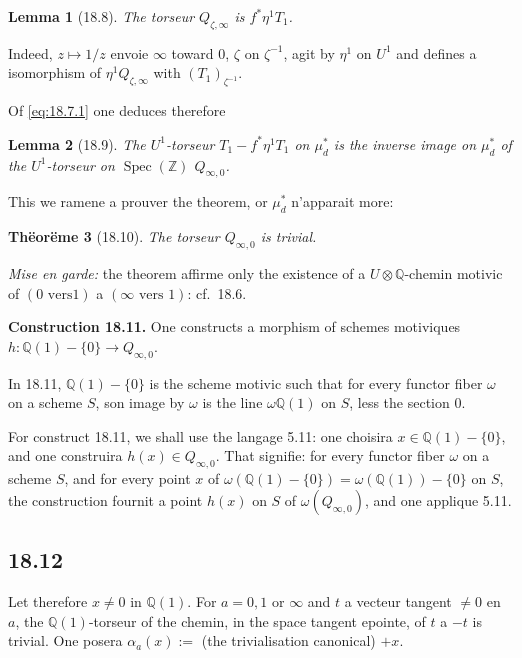 \documentclass[12pt,a4paper]{article}
\theoremstyle{plain}
\newtheorem{theorem}{Th\"eor\"eme}[section]
\newtheorem{lemma}[theorem]{Lemma}
\theoremstyle{definition}
\theoremstyle{remark}
\DeclareMathOperator{\Spec}{Spec}
\newcommand{\ZZ}{\mathbb{Z}}
\newcommand{\QQ}{\mathbb{Q}}
\begin{document}
\begin{lemma}[18.8]\label{lem:18.8}
The torseur $Q_{\zeta,\infty}$ is $f^*\eta^1 T_1$.
\end{lemma}

Indeed, $z \mapsto 1/z$ envoie $\infty$ toward $0$, $\zeta$ on
$\zeta^{-1}$, agit by $\eta^1$ on $U^1$ and defines a isomorphism of
$\eta^1 Q_{\zeta,\infty}$ with $(T_1)_{\zeta^{-1}}$.

Of \eqref{eq:18.7.1} one deduces therefore

\begin{lemma}[18.9]\label{lem:18.9}
The $U^1$-torseur $T_1 - f^*\eta^1 T_1$ on $\mu_d^*$ is the inverse image on $\mu_d^*$ of the $U^1$-torseur on $\Spec(\ZZ)$ $Q_{\infty,0}$.
\end{lemma}

This we ramene a prouver the theorem, or $\mu_d^*$ n'apparait more:

\begin{theorem}[18.10]\label{thm:18.10}
The torseur $Q_{\infty,0}$ is trivial.
\end{theorem}

\noindent \textit{Mise en garde:} the theorem affirme only
the existence of a $U \otimes \QQ$-chemin motivic of $(0 \text{ vers
} 1)$ a $(\infty \text{ vers } 1)$: cf.\ 18.6.

\noindent \textbf{Construction 18.11.}\label{cons:18.11}
One constructs a morphism of schemes motiviques
$h : \QQ(1) - \{0\} \to Q_{\infty,0}$.

In 18.11, $\QQ(1) - \{0\}$ is the scheme motivic such that for every functor fiber $\omega$ on a scheme $S$, son image by $\omega$
is the line $\omega\QQ(1)$ on $S$, less the section $0$.

For construct 18.11, we shall use the langage 5.11: one
choisira $x \in \QQ(1) - \{0\}$, and one construira
$h(x) \in Q_{\infty,0}$. That signifie: for every functor fiber
$\omega$ on a scheme $S$, and for every point $x$ of
$\omega(\QQ(1)-\{0\}) = \omega(\QQ(1)) - \{0\}$ on $S$, the
construction fournit a point $h(x)$ on $S$ of $\omega(Q_{\infty,0})$,
and one applique 5.11.

\subsection{18.12}

Let therefore $x \neq 0$ in $\QQ(1)$. For $a = 0, 1$ or $\infty$ and $t$
a vecteur tangent $\neq 0$ en $a$, the $\QQ(1)$-torseur of the chemin,
in the space tangent epointe, of $t$ a $-t$ is trivial. One posera
$\alpha_a(x) :=$ (the trivialisation canonical) $+ x$.
\end{document}
